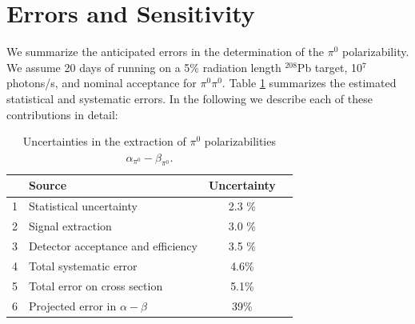 \section{Errors and Sensitivity}
We summarize the anticipated errors in the determination of the $\pi^0$ polarizability. We assume 
20 days of running on a 5\% radiation length $^{208}$Pb target, 10$^7$ photons/s, and nominal acceptance for $\pi^0 \pi^0$.
Table \ref{errors} summarizes the estimated statistical and systematic errors. In the following we describe each of
these contributions in detail: 

\begin{table}[bt]
\caption{Uncertainties in the extraction of $\pi^0$ polarizabilities $\alpha_{\pi^0}-\beta_{\pi^0}$.
\label{errors}
}
\begin{center}
\begin{tabular}{|l|l|c|c|}
\hline
\hline
  &  Source  & Uncertainty   \\  \hline \hline
  1 & Statistical uncertainty  &  2.3 \%    \\ \hline
  2 & Signal extraction  & 3.0 \%  \\ \hline
  3 & Detector acceptance and efficiency &  3.5 \%   \\ \hline
  4 & Total systematic error  &  4.6\% \\ \hline
  5 & Total error on cross section  &  5.1\% \\ \hline
  6 & Projected error in $\alpha - \beta$ &  39\%  \\ 
 \hline
 \hline
\end{tabular}
\end{center}
\end{table}

